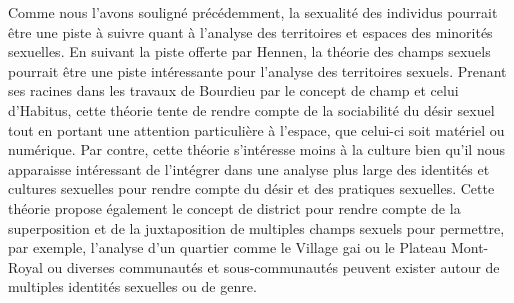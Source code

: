 Comme nous l'avons souligné précédemment, la sexualité des individus pourrait être une piste à suivre quant à l'analyse des territoires et espaces des minorités sexuelles.
En suivant la piste offerte par Hennen, la théorie des champs sexuels pourrait être une piste intéressante pour l'analyse des territoires sexuels.
Prenant ses racines dans les travaux de Bourdieu par le concept de champ et celui d'Habitus, cette théorie tente de rendre compte de la sociabilité du désir sexuel tout en portant une attention particulière à l'espace, que celui-ci soit matériel ou numérique.
Par contre, cette théorie s'intéresse moins à la culture bien qu'il nous apparaisse intéressant de l'intégrer dans une analyse plus large des identités et cultures sexuelles pour rendre compte du désir et des pratiques sexuelles.
Cette théorie propose également le concept de district pour rendre compte de la superposition et de la juxtaposition de multiples champs sexuels pour permettre, par exemple, l'analyse d'un quartier comme le Village gai ou le Plateau Mont-Royal ou diverses communautés et sous-communautés peuvent exister autour de multiples identités sexuelles ou de genre.


